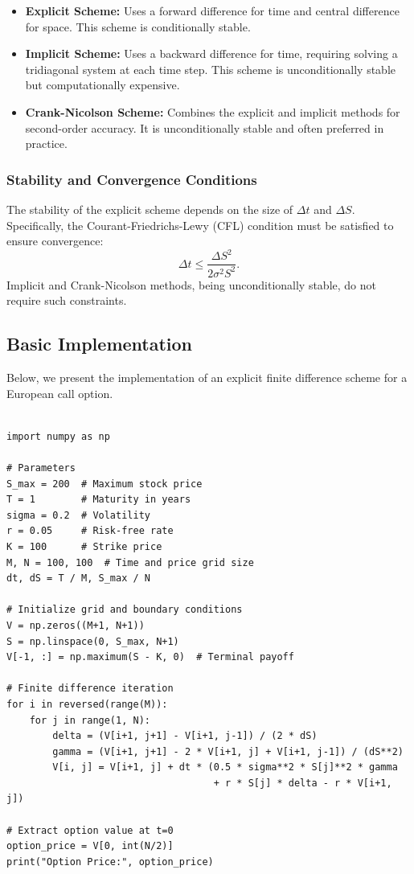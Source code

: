 \documentclass[12pt,a4paper]{report}
\begin{document}
\begin{itemize}
    \item \textbf{Explicit Scheme:} Uses a forward difference for time and central difference for space. This scheme is conditionally stable.
    \item \textbf{Implicit Scheme:} Uses a backward difference for time, requiring solving a tridiagonal system at each time step. This scheme is unconditionally stable but computationally expensive.
    \item \textbf{Crank-Nicolson Scheme:} Combines the explicit and implicit methods for second-order accuracy. It is unconditionally stable and often preferred in practice.
\end{itemize}

\subsubsection{Stability and Convergence Conditions}
The stability of the explicit scheme depends on the size of \( \Delta t \) and \( \Delta S \). Specifically, the Courant-Friedrichs-Lewy (CFL) condition must be satisfied to ensure convergence:
\[
\Delta t \leq \frac{\Delta S^2}{2 \sigma^2 S^2}.
\]
Implicit and Crank-Nicolson methods, being unconditionally stable, do not require such constraints.

\subsection{Basic Implementation}
Below, we present the implementation of an explicit finite difference scheme for a European call option. 

\begin{tcolorbox}[colframe=blue!50!black, colback=blue!5, title=Explicit Finite Difference Scheme]

\begin{verbatim}

import numpy as np

# Parameters
S_max = 200  # Maximum stock price
T = 1        # Maturity in years
sigma = 0.2  # Volatility
r = 0.05     # Risk-free rate
K = 100      # Strike price
M, N = 100, 100  # Time and price grid size
dt, dS = T / M, S_max / N

# Initialize grid and boundary conditions
V = np.zeros((M+1, N+1))
S = np.linspace(0, S_max, N+1)
V[-1, :] = np.maximum(S - K, 0)  # Terminal payoff

# Finite difference iteration
for i in reversed(range(M)):
    for j in range(1, N):
        delta = (V[i+1, j+1] - V[i+1, j-1]) / (2 * dS)
        gamma = (V[i+1, j+1] - 2 * V[i+1, j] + V[i+1, j-1]) / (dS**2)
        V[i, j] = V[i+1, j] + dt * (0.5 * sigma**2 * S[j]**2 * gamma 
                                    + r * S[j] * delta - r * V[i+1, j])

# Extract option value at t=0
option_price = V[0, int(N/2)]
print("Option Price:", option_price)
\end{verbatim}
\end{tcolorbox}
\end{document}
